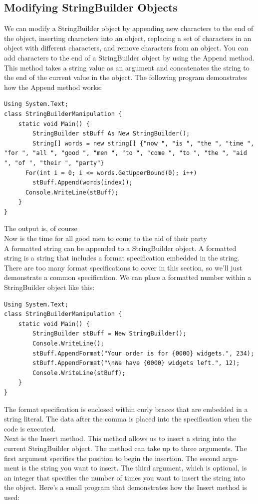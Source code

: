\documentclass[12pt,a4paper,final,twoside,titlepage]{book}
\begin{document}
\subsection{Modifying StringBuilder Objects}
We can modify a StringBuilder object by appending new characters to the end of the object, inserting characters into an object, replacing a set of characters in an object with different characters, and remove characters from an object. You can add characters to the end of a StringBuilder object by using the Append method. This method takes a string value as an argument and concatenates the string to the end of the current value in the object. The following program demonstrates how the Append method works:
\begin{lstlisting}
Using System.Text; 
class StringBuilderManipulation {
	static void Main() {
		StringBuilder stBuff As New StringBuilder(); 
		String[] words = new string[] {"now ", "is ", "the ", "time ", "for ", "all ", "good ", "men ", "to ", "come ", "to ", "the ", "aid ", "of ", "their ", "party"}
      For(int i = 0; i <= words.GetUpperBound(0); i++)
      	stBuff.Append(words(index));
      Console.WriteLine(stBuff);
	}
}
\end{lstlisting}
The output is, of course\\
Now is the time for all good men to come to the aid of their party\\
A formatted string can be appended to a StringBuilder object. A formatted string is a string that includes a format specification embedded in the string. There are too many format specifications to cover in this section, so we’ll just demonstrate a common specification. We can place a formatted number within a StringBuilder object like this:
\begin{lstlisting}
Using System.Text; 
class StringBuilderManipulation {
	static void Main() {
		StringBuilder stBuff = New StringBuilder(); 
		Console.WriteLine(); 
		stBuff.AppendFormat("Your order is for {0000} widgets.", 234);
		stBuff.AppendFormat("\nWe have {0000} widgets left.", 12);
		Console.WriteLine(stBuff);
	}
}
\end{lstlisting}
The format specification is enclosed within curly braces that are embedded in a string literal. The data after the comma is placed into the specification when the code is executed.\\ 
Next is the Insert method. This method allows us to insert a string into the current StringBuilder object. The method can take up to three arguments. The first argument specifies the position to begin the insertion. The second argu- ment is the string you want to insert. The third argument, which is optional, is an integer that specifies the number of times you want to insert the string into the object. Here’s a small program that demonstrates how the Insert method is used:
\end{document}
